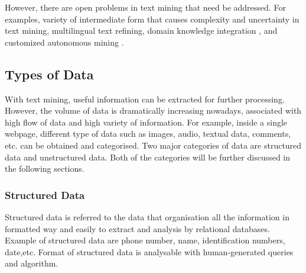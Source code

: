 \documentclass[twoside]{utmthesis}
\begin{document}
However, there are open problems in text mining that need be addressed. For examples, variety of intermediate form that causes complexity and uncertainty in text mining, multilingual text refining, domain knowledge integration \citep{lima2009domain}, and customized autonomous mining \citep{afzal2010rule}.

\subsection{Types of Data}
With text mining, useful information can be extracted for further processing. However, the volume of data is dramatically increasing nowadays, associated with high flow of data and high variety of information. For example, inside a single webpage, different type of data such as images, audio, textual data, comments, etc. can be obtained and categorised. Two major categories of data are structured data and unstructured data. Both of the categories will be further discussed in the following sections. 

\subsubsection{Structured Data}
Structured data is referred to the data that organisation all the information in formatted way and easily to extract and analysis by relational databases\citep{christinetaylor2018}. Example of structured data are phone number, name, identification numbers, date,etc. Format of structured data is analysable with human-generated queries and algorithm.  
\end{document}
